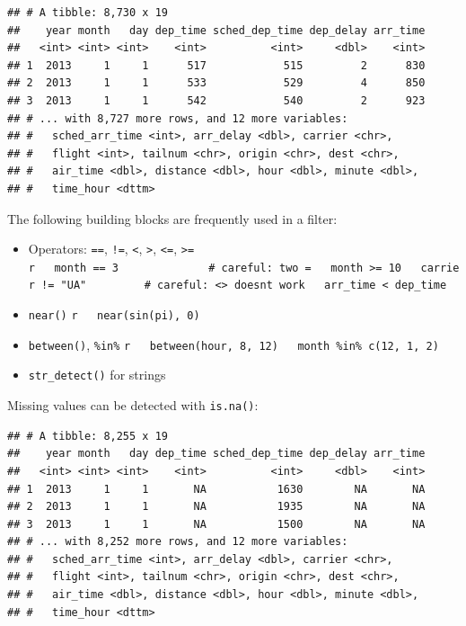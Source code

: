 \documentclass[]{book}
\newenvironment{Shaded}{}{}
\newcommand{\KeywordTok}[1]{\textcolor[rgb]{0.00,0.00,1.00}{#1}}
\newcommand{\NormalTok}[1]{#1}
\newcommand{\OperatorTok}[1]{#1}
\newcommand{\StringTok}[1]{\textcolor[rgb]{0.00,0.50,0.50}{#1}}
\begin{document}
\begin{verbatim}
## # A tibble: 8,730 x 19
##    year month   day dep_time sched_dep_time dep_delay arr_time
##   <int> <int> <int>    <int>          <int>     <dbl>    <int>
## 1  2013     1     1      517            515         2      830
## 2  2013     1     1      533            529         4      850
## 3  2013     1     1      542            540         2      923
## # ... with 8,727 more rows, and 12 more variables:
## #   sched_arr_time <int>, arr_delay <dbl>, carrier <chr>,
## #   flight <int>, tailnum <chr>, origin <chr>, dest <chr>,
## #   air_time <dbl>, distance <dbl>, hour <dbl>, minute <dbl>,
## #   time_hour <dttm>
\end{verbatim}

The following building blocks are frequently used in a filter:

\begin{itemize}
\item
  Operators: \texttt{==}, \texttt{!=}, \texttt{\textless{}}, \texttt{\textgreater{}}, \texttt{\textless{}=}, \texttt{\textgreater{}=}
  \texttt{r\ \ \ month\ ==\ 3\ \ \ \ \ \ \ \ \ \ \ \ \ \ \#\ careful:\ two\ =\ \ \ month\ \textgreater{}=\ 10\ \ \ carrier\ !=\ "UA"\ \ \ \ \ \ \ \ \ \#\ careful:\ \textless{}\textgreater{}\ doesn\textquotesingle{}t\ work\ \ \ arr\_time\ \textless{}\ dep\_time}
\item
  \texttt{near()}
  \texttt{r\ \ \ near(sin(pi),\ 0)}
\item
  \texttt{between()}, \texttt{\%in\%}
  \texttt{r\ \ \ between(hour,\ 8,\ 12)\ \ \ month\ \%in\%\ c(12,\ 1,\ 2)}
\item
  \texttt{str\_detect()} for strings
\end{itemize}

Missing values can be detected with \texttt{is.na()}:

\begin{Shaded}
\end{Shaded}

\begin{verbatim}
## # A tibble: 8,255 x 19
##    year month   day dep_time sched_dep_time dep_delay arr_time
##   <int> <int> <int>    <int>          <int>     <dbl>    <int>
## 1  2013     1     1       NA           1630        NA       NA
## 2  2013     1     1       NA           1935        NA       NA
## 3  2013     1     1       NA           1500        NA       NA
## # ... with 8,252 more rows, and 12 more variables:
## #   sched_arr_time <int>, arr_delay <dbl>, carrier <chr>,
## #   flight <int>, tailnum <chr>, origin <chr>, dest <chr>,
## #   air_time <dbl>, distance <dbl>, hour <dbl>, minute <dbl>,
## #   time_hour <dttm>
\end{verbatim}
\end{document}
